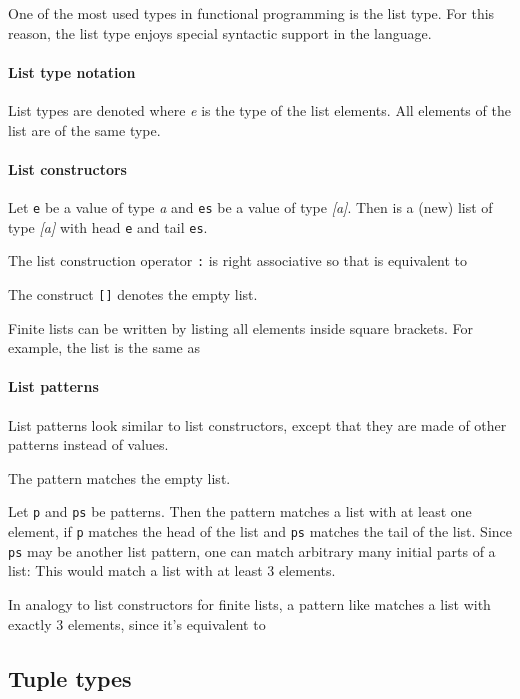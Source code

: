 One of the most used types in functional programming is the list type.
For this reason, the list type enjoys special syntactic support in the
\frege{} language.

\paragraph*{List type notation}

List types are denoted \ex{[{\it e}]} where {\it e} is the type of the
list elements. All elements of the list are of the same type.

\paragraph*{List constructors}

Let {\tt e} be a value of type {\it a} and {\tt es} be a value of type
{\it [a]}. Then  is a (new) list of type {\it [a]} with head
{\tt e} and tail {\tt es}.

The list construction operator {\tt :} is right associative so that
 is equivalent to 

The construct {\tt []} denotes the empty list.

Finite lists can be written by listing all elements inside square
brackets. For example, the list
\ex{[1,2,3]}
is the same as

\paragraph*{List patterns}  \label{listpattern}

List patterns look similar to list constructors, except that they are
made of other patterns instead of values.

The pattern \ex{[]} matches the empty list.

Let \texttt{p} and \texttt{ps} be patterns.
Then the pattern  matches a list with at least one element, if
\texttt{p} matches the head of the list and \texttt{ps} matches the tail
of the list.
Since \texttt{ps} may be another list pattern, one can match arbitrary
many initial parts of a list: 
This would match a list with at least 3 elements.

In analogy to list constructors for finite lists, a pattern like
\ex{[p1, p2, p3]} matches a list with exactly 3 elements, since it's
equivalent to 

\subsection{Tuple types} \label{tupletypes} 

